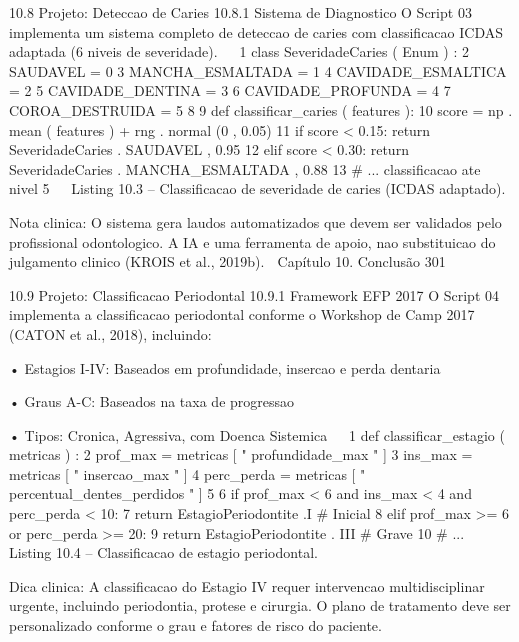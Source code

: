   10.8      Projeto: Deteccao de Caries
  10.8.1     Sistema de Diagnostico
  O Script 03 implementa um sistema completo de deteccao de caries com classificacao
  ICDAS adaptada (6 niveis de severidade).
                                                                                         
 1 class SeveridadeCaries ( Enum ) :
 2     SAUDAVEL = 0
 3     MANCHA_ESMALTADA = 1
 4     CAVIDADE_ESMALTICA = 2
 5     CAVIDADE_DENTINA = 3
 6     CAVIDADE_PROFUNDA = 4
 7     COROA_DESTRUIDA = 5
 8
 9 def classificar_caries ( features ):
10     score = np . mean ( features ) + rng . normal (0 , 0.05)
11     if score < 0.15: return SeveridadeCaries . SAUDAVEL , 0.95
12     elif score < 0.30: return SeveridadeCaries . MANCHA_ESMALTADA , 0.88
13     # ... classificacao ate nivel 5
                                                                                         
         Listing 10.3 – Classificacao de severidade de caries (ICDAS adaptado).


     Nota clinica: O sistema gera laudos automatizados que devem ser validados
     pelo profissional odontologico. A IA e uma ferramenta de apoio, nao substituicao
     do julgamento clinico (KROIS et al., 2019b).
  Capítulo 10. Conclusão                                                              301


  10.9      Projeto: Classificacao Periodontal
  10.9.1     Framework EFP 2017
  O Script 04 implementa a classificacao periodontal conforme o Workshop de Camp
  2017 (CATON et al., 2018), incluindo:

      • Estagios I-IV: Baseados em profundidade, insercao e perda dentaria

      • Graus A-C: Baseados na taxa de progressao

      • Tipos: Cronica, Agressiva, com Doenca Sistemica
                                                                                           
 1 def classificar_estagio ( metricas ) :
 2     prof_max = metricas [ " profundidade_max " ]
 3     ins_max = metricas [ " insercao_max " ]
 4     perc_perda = metricas [ " percentual_dentes_perdidos " ]
 5
 6     if prof_max < 6 and ins_max < 4 and perc_perda < 10:
 7         return EstagioPeriodontite .I       # Inicial
 8     elif prof_max >= 6 or perc_perda >= 20:
 9         return EstagioPeriodontite . III # Grave
10     # ...
                                                                                           
                    Listing 10.4 – Classificacao de estagio periodontal.


     Dica clinica: A classificacao do Estagio IV requer intervencao multidisciplinar
     urgente, incluindo periodontia, protese e cirurgia. O plano de tratamento deve ser
     personalizado conforme o grau e fatores de risco do paciente.


